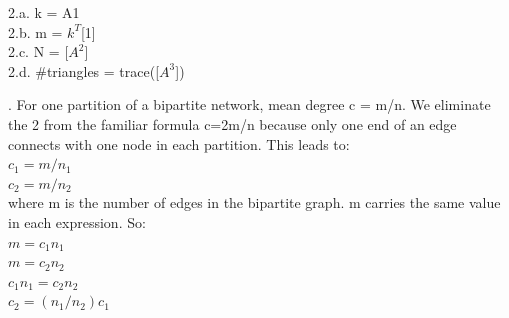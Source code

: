 \documentclass[11pt, oneside]{article}   	%
\begin{document}
\bigskip\bigskip
\justify
2.a. k = A1\\
2.b.  m = $k^T$[1]\\
2.c.  N = [$A^2$]\\
2.d.  \#triangles = trace([$A^3$])

\bigskip
\bigskip
{}.  For one partition of a  bipartite network, mean degree c = m/n.  We eliminate the 2 from the familiar formula c=2m/n because only one end of an edge connects with one node in each partition.  This leads to:\\
\indent 
$c_1 = m/n_1$\\
\indent 
$c_2 = m/n_2$\\
where m is the number of edges in the bipartite graph.  m carries the same value in each expression.  So:\\
$m=c_1n_1$\\
$m=c_2 n_2$\\
$c_1n_1 = c_2n_2$\\
$c_2 = (n_1/n_2) c_1$\\
\end{document}
